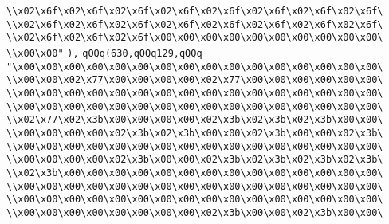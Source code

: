 \verb|\\x02\x6f\x02\x6f\x02\x6f\x02\x6f\x02\x6f\x02\x6f\x02\x6f\x02\x6f\|\newline
\verb|\\x02\x6f\x02\x6f\x02\x6f\x02\x6f\x02\x6f\x02\x6f\x02\x6f\x02\x6f\|\newline
\verb|\\x02\x6f\x02\x6f\x02\x6f\x00\x00\x00\x00\x00\x00\x00\x00\x00\x00\|\newline
\verb|\\x00\x00"|\newline
\verb|),|\newline
\verb|qQQq(630,qQQq129,qQQq|\newline
\verb|"\x00\x00\x00\x00\x00\x00\x00\x00\x00\x00\x00\x00\x00\x00\x00\x00\|\newline
\verb|\\x00\x00\x02\x77\x00\x00\x00\x00\x02\x77\x00\x00\x00\x00\x00\x00\|\newline
\verb|\\x00\x00\x00\x00\x00\x00\x00\x00\x00\x00\x00\x00\x00\x00\x00\x00\|\newline
\verb|\\x00\x00\x00\x00\x00\x00\x00\x00\x00\x00\x00\x00\x00\x00\x00\x00\|\newline
\verb|\\x02\x77\x02\x3b\x00\x00\x00\x00\x02\x3b\x02\x3b\x02\x3b\x00\x00\|\newline
\verb|\\x00\x00\x00\x00\x02\x3b\x02\x3b\x00\x00\x02\x3b\x00\x00\x02\x3b\|\newline
\verb|\\x00\x00\x00\x00\x00\x00\x00\x00\x00\x00\x00\x00\x00\x00\x00\x00\|\newline
\verb|\\x00\x00\x00\x00\x02\x3b\x00\x00\x02\x3b\x02\x3b\x02\x3b\x02\x3b\|\newline
\verb|\\x02\x3b\x00\x00\x00\x00\x00\x00\x00\x00\x00\x00\x00\x00\x00\x00\|\newline
\verb|\\x00\x00\x00\x00\x00\x00\x00\x00\x00\x00\x00\x00\x00\x00\x00\x00\|\newline
\verb|\\x00\x00\x00\x00\x00\x00\x00\x00\x00\x00\x00\x00\x00\x00\x00\x00\|\newline
\verb|\\x00\x00\x00\x00\x00\x00\x00\x00\x02\x3b\x00\x00\x02\x3b\x00\x00\|\newline
